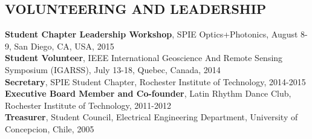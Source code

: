 \documentclass[11pt]{res} %
\begin{document}
\begin{resume}
\vspace{-0.1in}
\section{VOLUNTEERING AND LEADERSHIP}
\vspace{0.1in}
{\bf Student Chapter Leadership Workshop}, SPIE Optics+Photonics, August 8-9, San Diego, CA, USA, 2015
\vspace{0.1in}\\
{\bf Student Volunteer}, IEEE International Geoscience And Remote Sensing Symposium (IGARSS), July 13-18, Quebec, Canada, 2014
\vspace{0.1in}\\
{\bf Secretary}, SPIE Student Chapter, Rochester Institute of Technology, 2014-2015
\vspace{0.1in}\\
{\bf Executive Board Member and Co-founder}, Latin Rhythm Dance Club, Rochester Institute of Technology, 2011-2012
\vspace{0.1in}\\
{\bf Treasurer}, Student Council, Electrical Engineering Department, University of Concepcion, Chile, 2005\\

\vspace{-0.2in}

\end{resume}
\end{document}
